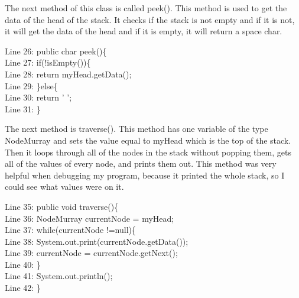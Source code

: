 \documentclass{article}
\begin{document}
\noindent
The next method of this class is called peek(). This method is used to get the data of the head of the stack. It checks if the stack is not empty and if it is not, it will get the data of the head and if it is empty, it will return a space char.  

\vspace{2em}
Line 26: public char peek()\{\\
    \hspace*{1.5em}Line 27: \hspace*{1em}if(!isEmpty())\{\\
    \hspace*{1.5em}Line 28: \hspace*{2em}return myHead.getData();\\
    \hspace*{1.5em}Line 29:\hspace*{1em} \}else\{\\
    \hspace*{1.5em}Line 30: \hspace*{2em} return ' ';\\
    \hspace*{1.5em}Line 31: \}\\
\vspace{2em}

\noindent
The next method is traverse(). This method has one variable of the type NodeMurray and sets the value equal to myHead which is the top of the stack. Then it loops through all of the nodes in the stack without popping them, gets all of the values of every node, and prints them out. This method was very helpful when debugging my program, because it printed the whole stack, so I could see what values were on it. 

\vspace{2em}
Line 35: public void traverse()\{\\
    \hspace*{1.5em}Line 36:\hspace*{1em} NodeMurray currentNode = myHead;\\
    \hspace*{1.5em}Line 37:\hspace*{1em} while(currentNode !=null)\{\\
    \hspace*{1.5em}Line 38: \hspace*{2em} System.out.print(currentNode.getData());\\
    \hspace*{1.5em}Line 39:\hspace*{2em} currentNode = currentNode.getNext();\\
    \hspace*{1.5em}Line 40:\hspace*{1em} \}\\
    \hspace*{1.5em}Line 41: \hspace*{1em}System.out.println();\\
    \hspace*{1.5em}Line 42: \}\\
\vspace{2em}
\end{document}
